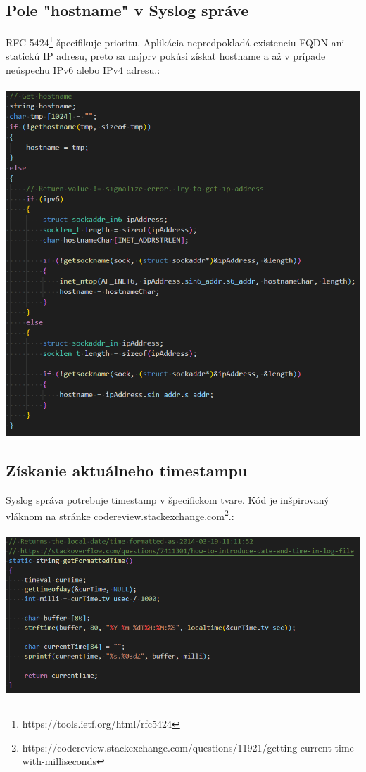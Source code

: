 \documentclass{article}
\begin{document}
        \subsection{Pole "hostname" v Syslog správe}
        RFC 5424\footnote{https://tools.ietf.org/html/rfc5424} špecifikuje prioritu. Aplikácia nepredpokladá existenciu FQDN ani statickú IP adresu, preto
        sa najprv pokúsi získať hostname a až v prípade neúspechu IPv6 alebo IPv4 adresu.:\\\\
        \includegraphics[scale=0.5]{hostname.png}

        \newpage

        \subsection{Získanie aktuálneho timestampu}
        Syslog správa potrebuje timestamp v špecifickom tvare. Kód je inšpirovaný vláknom na stránke
        codereview.stackexchange.com\footnote{https://codereview.stackexchange.com/questions/11921/getting-current-time-with-milliseconds}.:\\\\
        \includegraphics[scale=0.6]{timestamp.png}
\end{document}
